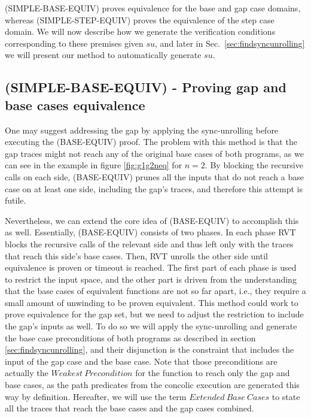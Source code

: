 (SIMPLE-BASE-EQUIV) proves equivalence for the base and gap case domains, whereas (SIMPLE-STEP-EQUIV) proves the equivalence of the step case domain. We will now describe how we generate the verification conditions corresponding to these premises given $su$, and later in Sec.~\ref{sec:findsyncunrolling} we will present our method to automatically generate $su$.

\subsection{(SIMPLE-BASE-EQUIV) - Proving gap and base cases equivalence}\label{sec:SIMPLE-BASE-EQUIV}
One may suggest addressing the gap  by applying the sync-unrolling before executing the (BASE-EQUIV) proof. The problem with this method is that the gap traces might not reach any of the original base cases of both programs, as we can see in the example in figure \ref{fig:g1g2neq} for $n=2$. By blocking the recursive calls on each side, (BASE-EQUIV) prunes all the inputs that do not reach a base case on at least one side, including the gap's traces, and therefore this attempt is futile.

Nevertheless, we can extend the core idea of (BASE-EQUIV) to accomplish this as well. Essentially, (BASE-EQUIV) consists of two phases. In each phase RVT blocks the recursive calls of the relevant side and thus left only with the traces that reach this side's base cases. Then, RVT unrolls the other side until equivalence  is proven or timeout is reached. The first part of each phase is used to restrict the input space, and the other part is driven from the understanding that the base cases of equivalent functions are not so far apart, i.e., they require a small amount of unwinding to be proven equivalent. This method could work to prove equivalence for the gap set, but we need to adjust the restriction to include the gap's inputs as well. To do so we will apply the sync-unrolling and generate the base case preconditions of both programs as described in section \ref{sec:findsyncunrolling}, and their disjunction is the constraint that includes the input of the gap case and the base case. Note that those preconditions are actually the $Weakest\ Precondition$ \cite{10.1145/360933.360975} for the function to reach only the gap and base cases, as the path predicates from the concolic execution are generated this way by definition.
Hereafter, we will use the term $Extended\ Base\ Cases$ to state all the traces that reach the base cases and the gap cases combined. 

